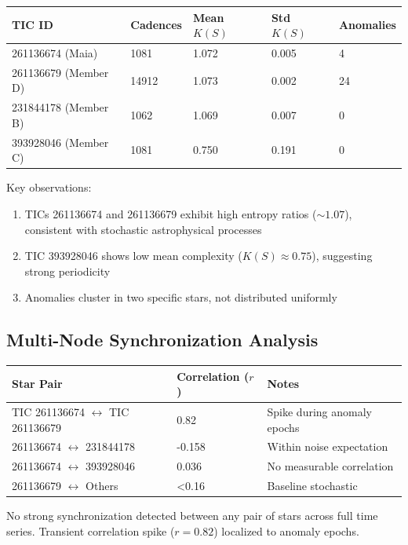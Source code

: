 \documentclass[twocolumn,10pt]{article}
\begin{document}
\begin{center}
\begin{tabular}{lllll}
\toprule
TIC ID & Cadences & Mean $K(S)$ & Std $K(S)$ & Anomalies \\
\midrule
261136674 (Maia) & 1081 & 1.072 & 0.005 & 4 \\
261136679 (Member D) & 14912 & 1.073 & 0.002 & 24 \\
231844178 (Member B) & 1062 & 1.069 & 0.007 & 0 \\
393928046 (Member C) & 1081 & 0.750 & 0.191 & 0 \\
\bottomrule
\end{tabular}
\end{center}

Key observations:
\begin{enumerate}
    \item TICs 261136674 and 261136679 exhibit high entropy ratios ($\sim 1.07$), consistent with stochastic astrophysical processes
    \item TIC 393928046 shows low mean complexity ($K(S) \approx 0.75$), suggesting strong periodicity
    \item Anomalies cluster in two specific stars, not distributed uniformly
\end{enumerate}

\subsection{Multi-Node Synchronization Analysis}

\begin{center}
\begin{tabular}{lll}
\toprule
Star Pair & Correlation ($r$) & Notes \\
\midrule
TIC 261136674 $\leftrightarrow$ TIC 261136679 & 0.82 & Spike during anomaly epochs \\
261136674 $\leftrightarrow$ 231844178 & -0.158 & Within noise expectation \\
261136674 $\leftrightarrow$ 393928046 & 0.036 & No measurable correlation \\
261136679 $\leftrightarrow$ Others & <0.16 & Baseline stochastic \\
\bottomrule
\end{tabular}
\end{center}

No strong synchronization detected between any pair of stars across full time series. Transient correlation spike ($r=0.82$) localized to anomaly epochs.
\end{document}
